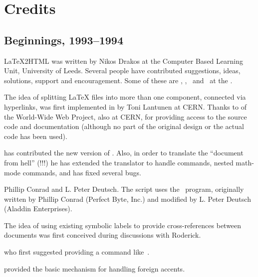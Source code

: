 \section{Credits\label{credits}}%
\subsection*{Beginnings, 1993--1994}%
\html{\\}%
\LaTeX2HTML{} was written by Nikos Drakos at the
Computer Based Learning Unit, University of Leeds.
Several people have contributed suggestions, ideas, solutions, support
and encouragement. Some of these are \RodWilliams, \AnaPaiva, 
\JamilSawar\ and \AndrewCole\ at the \CBLU.

\begin{htmllist}
%
\item [\CERN]
The idea of splitting \LaTeX{}  files
into more than one component, connected via hyperlinks, 
was first implemented in \Perl{} by Toni Lantunen at CERN.
Thanks to \RobertCailliau{} of the World-Wide Web Project, also at CERN, 
for providing access to the source code and documentation 
(although no part of the original design or the actual code has been used).


\item [\RobertThau]
has contributed the new version of . 
Also, in order to translate the ``document from hell'' (!!!) 
he has extended the translator to handle  commands, 
nested math-mode commands, and has fixed several bugs.

\item [Phillip Conrad and L. Peter Deutsch.]
The  \Perl{} script uses the  \PS\ program, 
originally written by Phillip Conrad (Perfect Byte, Inc.) and 
modified by L. Peter Deutsch (Aladdin Enterprises).

\item [\RodWilliams]
The idea of using existing symbolic labels to provide cross-references
between documents was first conceived during discussions with Roderick.


\item [\EricCarroll] 
who first suggested providing a command like \,. 

%

\item [\FranzVojik]
provided the basic mechanism for handling foreign accents.



\end{htmllist}
